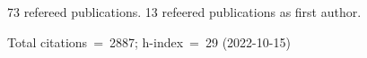 73 refereed publications. 13 refeered publications as first author.

Total citations~=~2887; h-index~=~29 (2022-10-15)